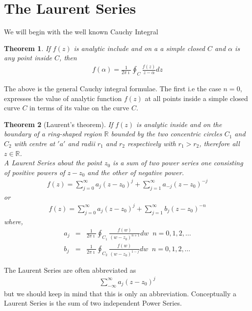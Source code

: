 \documentclass[11pt]{report}
\newcommand{\sps}{\\[0.2cm]}
\newcommand{\real}{ \mathbb{R}}
\newcommand{\imaginary}{\imath}
\newtheorem{theorem}{Theorem}[chapter]
\begin{document}
	\section{The Laurent Series}
	We will begin with the well known Cauchy Integral
	\begin{theorem}
		If $f(z)$ is analytic include and on a a simple closed $C$ and $\alpha$ is any point inside $C$, then
		\begin{eqnarray}
			f(\alpha) = \frac{1}{2\pi\imaginary}\oint_C\frac{f(z)}{z-\alpha}dz
		\end{eqnarray}
	\end{theorem}
	The above is the general Cauchy integral formulae. The first i.e the case $n=0$, expresses the value of analytic function $f(z)$ at all points inside a simple closed curve $C$ in terms of its value on the curve $C$.
	
	\begin{theorem}[Laurent's theorem]
		If $f(z)$ is analytic inside and on the boundary of a ring-shaped region $\real$ bounded by the two concentric circles $C_1$ and $C_2$ with centre at $'a'$ and radii $r_1$ and $r_2$ respectively with $r_1 > r_2$, therefore all $z\in\real$.\\
		A Laurent Series about the point $z_0$ is a sum of two power series one consisting of positive powers of $z-z_0$ and the other of negative power.
		\begin{eqnarray*}
			f(z) = \sum_{j=0}^{\infty}a_j(z-z_0)^j + \sum_{j=1}^{\infty}a_{-j}(z-z_0)^{-j}
		\end{eqnarray*}
		or
		\begin{eqnarray*}
			f(z) = \sum_{j=0}^{\infty}a_j(z-z_0)^j + \sum_{j=1}^{\infty}b_j(z-z_0)^{-n}
		\end{eqnarray*}
		where,
		\begin{eqnarray*}
			a_j &=& \frac{1}{2\pi\imaginary}\oint_{C_1}\frac{f(w)}{(w-z_0)^{n+1}}dw\;\; n=0,1,2,\ldots\sps
			b_j &=& \frac{1}{2\pi\imaginary}\oint_{C_2}\frac{f(w)}{(w-z_0)^{1-j}}dw\;\; n=0,1,2,\ldots
		\end{eqnarray*}
	\end{theorem}
	The Laurent Series are often abbreviated as 
	\begin{eqnarray}
		\sum_{-\infty}^{\infty} a_j(z-z_0)^j
	\end{eqnarray}
	but we should keep in mind that this is only an abbreviation. Conceptually a Laurent Series is the sum of two independent Power Series.\\
	
\end{document}
